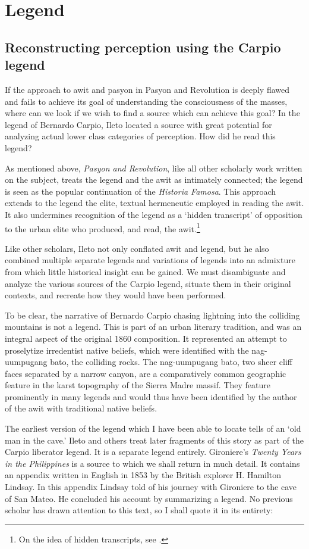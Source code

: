 \section{Legend}
\subsection{Reconstructing perception using the Carpio legend}

If the approach to awit and pasyon in Pasyon and Revolution is deeply flawed and fails to achieve its goal of understanding the consciousness of the masses, where can we look if we wish to find a source which can achieve this goal? In the legend of Bernardo Carpio, Ileto located a source with great potential for analyzing actual lower class categories of perception. How did he read this legend?

As mentioned above, \textit{Pasyon and Revolution}, like all other scholarly work written on the subject, treats the legend and the awit as intimately connected; the legend is seen as the popular continuation of the \textit{Historia Famosa}. This approach extends to the legend the elite, textual hermeneutic employed in reading the awit. It also undermines recognition of the legend as a \enquote*{hidden transcript} of opposition to the urban elite who produced, and read, the awit.\footnote{On the idea of hidden transcripts, see \cite{Scott1990}.}

Like other scholars, Ileto not only conflated awit and legend, but he also combined multiple separate legends and variations of legends into an admixture from which little historical insight can be gained. We must disambiguate and analyze the various sources of the Carpio legend, situate them in their original contexts, and recreate how they would have been performed.

To be clear, the narrative of Bernardo Carpio chasing lightning into the colliding mountains is not a legend. This is part of an urban literary tradition, and was an integral aspect of the original 1860 composition. It represented an attempt to proselytize irredentist native beliefs, which were identified with the nag-uumpugang bato, the colliding rocks. The nag-uumpugang bato, two sheer cliff faces separated by a narrow canyon, are a comparatively common geographic feature in the karst topography of the Sierra Madre massif. They feature prominently in many legends and would thus have been identified by the author of the awit with traditional native beliefs.

The earliest version of the legend which I have been able to locate tells of an \enquote*{old man in the cave.} Ileto and others treat later fragments of this story as part of the Carpio liberator legend. It is a separate legend entirely. Gironiere's \textit{Twenty Years in the Philippines} is a source to which we shall return in much detail. It contains an appendix written in English in 1853 by the British explorer H. Hamilton Lindsay. In this appendix Lindsay told of his journey with Gironiere to the cave of San Mateo. He concluded his account by summarizing a legend. No previous scholar has drawn attention to this text, so I shall quote it in its entirety:

